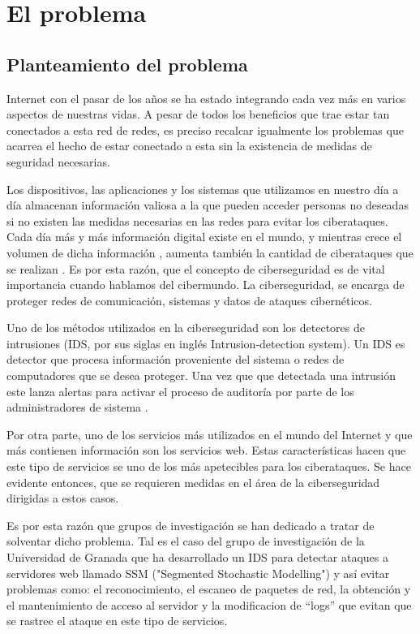 \chapter{El problema}
\label{capitulo1}

\section{Planteamiento del problema}

Internet con el pasar de los años se ha estado integrando cada vez más en varios aspectos de nuestras vidas. A pesar de todos los beneficios que trae estar tan conectados a esta red de redes, es preciso recalcar igualmente los problemas que acarrea el hecho de estar conectado a esta sin la existencia de medidas de seguridad necesarias. 

Los dispositivos, las aplicaciones y los sistemas que utilizamos en nuestro día a día almacenan información valiosa a la que pueden acceder personas no deseadas si no existen las medidas necesarias en las redes para evitar los ciberataques. Cada día más y más información digital existe en el mundo, y mientras crece el volumen de dicha información , aumenta también la cantidad de ciberataques que se realizan \cite{pwc}. Es por esta razón, que el concepto de ciberseguridad es de vital importancia cuando hablamos del cibermundo.  La ciberseguridad, se encarga de proteger redes de comunicación, sistemas y datos de ataques cibernéticos. 

Uno de los métodos utilizados en la ciberseguridad son los detectores de intrusiones (IDS, por sus siglas en inglés Intrusion-detection system). Un IDS es detector que procesa información proveniente del sistema o redes de computadores que se desea proteger. Una vez que que detectada una intrusión este lanza alertas para activar el proceso de auditoría por parte de los administradores de sistema \cite{IDS}. 

Por otra parte, uno de los servicios más utilizados en el mundo del Internet y que más contienen información son los servicios web. Estas características hacen que este tipo de servicios se uno de los más apetecibles para los ciberataques. Se hace evidente entonces, que se requieren medidas en el área de la ciberseguridad dirigidas a estos casos.

Es por esta razón que grupos de investigación se han dedicado a tratar de solventar dicho problema. Tal es el caso del grupo de investigación de la Universidad de Granada que  ha desarrollado un IDS para detectar ataques a servidores web llamado SSM ("Segmented Stochastic Modelling") y así evitar problemas como: el reconocimiento, el escaneo de paquetes de red, la obtención y el mantenimiento de acceso al servidor y la modificacion de ``logs'' que evitan que se rastree el ataque en este tipo de servicios.

